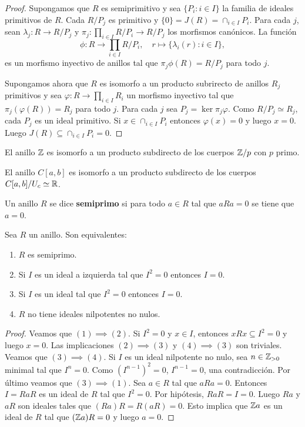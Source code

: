 \begin{proof}
	Supongamos que $R$ es semiprimitivo y sea $\{P_i:i\in I\}$ la familia de
	ideales primitivos de $R$. Cada $R/P_j$ es primitivo y
	$\{0\}=J(R)=\cap_{i\in I}P_i$. Para cada $j$, sean $\lambda_j\colon R\to
	R/P_j$ y $\pi_j\colon \prod_{i\in I}R/P_i\to R/P_j$ los morfismos
	canónicos. La función
	\[
		\phi\colon R\to\prod_{i\in I}R/P_i,\quad
		r\mapsto \{\lambda_i(r):i\in I\},
	\]
	es un morfismo inyectivo de anillos tal que $\pi_j\phi(R)=R/P_j$ para todo
	$j$.

	Supongamos ahora que $R$ es isomorfo a un producto subrirecto de anillos
	$R_j$ primitivos y sea $\varphi\colon R\to\prod_{i\in I}R_i$ un morfismo
	inyectivo tal que $\pi_j(\varphi(R))=R_j$ para todo $j$. Para cada $j$ sea
	$P_j=\ker\pi_j\varphi$. Como $R/P_j\simeq R_j$, cada $P_j$ es un ideal
	primitivo. Si $x\in\cap_{i\in I}P_i$ entonces $\varphi(x)=0$ y luego $x=0$.
	Luego $J(R)\subseteq\cap_{i\in I} P_i=0$. 
\end{proof}

\begin{example}
	El anillo $\mathbb{Z}$ es isomorfo a un producto subdirecto de los cuerpos $\mathbb{Z}/p$
	con $p$ primo.
\end{example}

\begin{example}
	El anillo $C[a,b]$ es isomorfo a un producto subdirecto de los cuerpos
	$C[a,b]/U_c\simeq\mathbb{R}$.
\end{example}

\begin{definition}
	Un anillo $R$ se dice \textbf{semiprimo} si para todo $a\in R$ tal que
	$aRa=0$ se tiene que $a=0$.
\end{definition}

\begin{lemma}
	Sea $R$ un anillo. Son equivalentes:
	\begin{enumerate}
		\item $R$ es semiprimo.
		\item Si $I$ es un ideal a izquierda tal que $I^2=0$ entonces $I=0$.
		\item Si $I$ es un ideal tal que $I^2=0$ entonces $I=0$.
		\item $R$ no tiene ideales nilpotentes no nulos. 
	\end{enumerate}
\end{lemma}

\begin{proof}
	Veamos que $(1)\implies(2)$. Si $I^2=0$ y $x\in I$, entonces $xRx\subseteq I^2=0$ y
	luego $x=0$. Las implicaciones $(2)\implies(3)$ y $(4)\implies(3)$ son triviales. Veamos que
	$(3)\implies(4)$.  Si $I$ es un ideal nilpotente no nulo, sea $n\in\mathbb{Z}_{>0}$ 
	minimal tal que $I^n=0$.  Como $(I^{n-1})^2=0$, $I^{n-1}=0$, una
	contradicción. Por último veamos que $(3)\implies(1)$. Sea $a\in R$ tal que
	$aRa=0$. Entonces $I=RaR$ es un ideal de $R$ tal que $I^2=0$. Por hipótesis, $RaR=I=0$. Luego
	$Ra$ y $aR$ son ideales tales que $(Ra)R=R(aR)=0$. Esto implica que $\mathbb{Z} a$ es un ideal de $R$
	tal que $(\mathbb{Z} a)R=0$ y luego $a=0$.
\end{proof}

